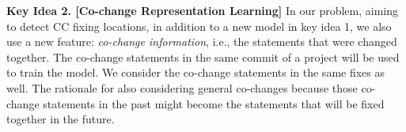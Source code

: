 





{\bf Key Idea 2. [Co-change Representation Learning]} In our problem,
aiming to detect CC fixing locations, in addition to a new model in
key idea 1, we also use a new feature: {\em co-change information},
i.e., the statements that were changed together. The co-change
statements in the same commit of a project will be used to train the
 model. We consider the co-change statements in the same
fixes as well. The rationale for also considering general co-changes
because those co-change statements in the past might become the
statements that will be fixed together in the future.



